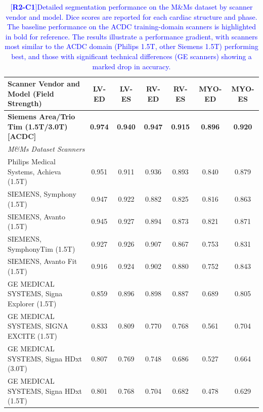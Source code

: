 \documentclass[fleqn,10pt]{wlscirep}
\newcommand{\revtag}[2]{[\textbf{R#1-C#2}]}
\newcommand{\Rtwo}[1]{\textcolor{blue}{#1}}
\begin{document}
\begin{table}[ht]
  \centering
  \caption{\Rtwo{\revtag{2}{1}Detailed segmentation performance on the M\&Ms dataset by scanner vendor and model. Dice scores are reported for each cardiac structure and phase. The baseline performance on the ACDC training-domain scanners is highlighted in bold for reference. The results illustrate a performance gradient, with scanners most similar to the ACDC domain (Philips 1.5T, other Siemens 1.5T) performing best, and those with significant technical differences (GE scanners) showing a marked drop in accuracy.}}
  \label{tab:mms_breakdown}
  \begin{tabular}{lcccccc}
    \toprule
    \textbf{Scanner Vendor and Model (Field Strength)} & \textbf{LV-ED} & \textbf{LV-ES} & \textbf{RV-ED} & \textbf{RV-ES} & \textbf{MYO-ED} & \textbf{MYO-ES} \\
    \midrule
    \textbf{Siemens Area/Trio Tim (1.5T/3.0T) [ACDC]} & \textbf{0.974} & \textbf{0.940} & \textbf{0.947} & \textbf{0.915} & \textbf{0.896} & \textbf{0.920} \\
    \midrule
    \multicolumn{7}{l}{\textit{M\&Ms Dataset Scanners}} \\
    Philips Medical Systems, Achieva (1.5T) & 0.951 & 0.911 & 0.936 & 0.893 & 0.840 & 0.879 \\
    SIEMENS, Symphony (1.5T) & 0.947 & 0.922 & 0.882 & 0.825 & 0.816 & 0.863 \\
    SIEMENS, Avanto (1.5T) & 0.945 & 0.927 & 0.894 & 0.873 & 0.821 & 0.871 \\
    SIEMENS, SymphonyTim (1.5T) & 0.927 & 0.926 & 0.907 & 0.867 & 0.753 & 0.831 \\
    SIEMENS, Avanto Fit (1.5T) & 0.916 & 0.924 & 0.902 & 0.880 & 0.752 & 0.843 \\
    GE MEDICAL SYSTEMS, Signa Explorer (1.5T) & 0.859 & 0.896 & 0.898 & 0.887 & 0.689 & 0.805 \\
    GE MEDICAL SYSTEMS, SIGNA EXCITE (1.5T) & 0.833 & 0.809 & 0.770 & 0.768 & 0.561 & 0.704 \\
    GE MEDICAL SYSTEMS, Signa HDxt (3.0T) & 0.807 & 0.769 & 0.748 & 0.686 & 0.527 & 0.664 \\
    GE MEDICAL SYSTEMS, Signa HDxt (1.5T) & 0.801 & 0.768 & 0.704 & 0.682 & 0.478 & 0.629 \\
    \bottomrule
  \end{tabular}
\end{table}
\end{document}
